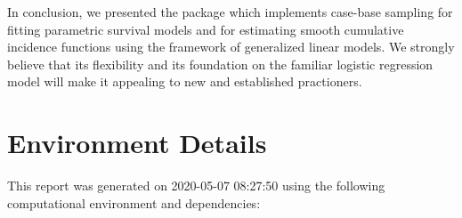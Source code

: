 \documentclass[
]{jss}
\begin{document}
In conclusion, we presented the  package 
which implements case-base sampling for fitting parametric survival
models and for estimating smooth cumulative incidence functions using
the framework of generalized linear models. We strongly believe that its
flexibility and its foundation on the familiar logistic regression model
will make it appealing to new and established practioners.

\hypertarget{environment-details}{%
\section{Environment Details}\label{environment-details}}

This report was generated on 2020-05-07 08:27:50 using the following
computational environment and dependencies:
\end{document}

